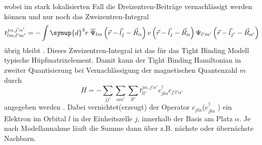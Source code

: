 wobei im stark lokalisierten Fall die Dreizentren-Beiträge vernachlässigt werden können und  
nur noch das Zweizentren-Integral 
\begin{equation*} 
    t^{j\alpha,j'\alpha'}_{lm,l'm'} = - \int \symup{d}^3r \; \overline{\Psi}_{lm} \left (\vec{r}-\vec{l}_j - \vec{R}_{\alpha} \right ) 
    v \left ( \vec{r} - \vec{l}_{j} - \vec{R}_{\alpha} \right ) \Psi_{l'm'} \left (\vec{r}-\vec{l}_{j'} - \vec{R}_{\alpha'} \right ) 
\end{equation*}
übrig bleibt \cite{SC_literature}.
Dieses Zweizentren-Integral ist das für das Tight Binding Modell typische Hüpfmatrixelement.
Damit kann der Tight Binding Hamiltonian in zweiter Quantisierung bei Vernachlässigung der 
magnetischen Quantenzahl $m$ durch
\begin{equation}
    H = - \sum_{jj'} \sum_{\alpha \alpha'}\sum_{ll'} t^{j\alpha,j'\alpha'}_{ll'}  c_{jl\alpha}^\dagger c_{j'l'\alpha'}  \label{eqn:tight-binding-hamiltonian}
\end{equation}
angegeben werden \cite{anders-fkt}.
Dabei vernichtet(erzeugt) der Operator $c_{jl\alpha}$($c_{jl\alpha}^{\dagger}$ ) ein Elektron im Orbital $l$ in der Einheitszelle $j$,
innerhalb der Basis am Platz $\alpha$.
Je nach Modellannahme läuft die Summe dann über z.B. nächste oder übernächste Nachbarn.
